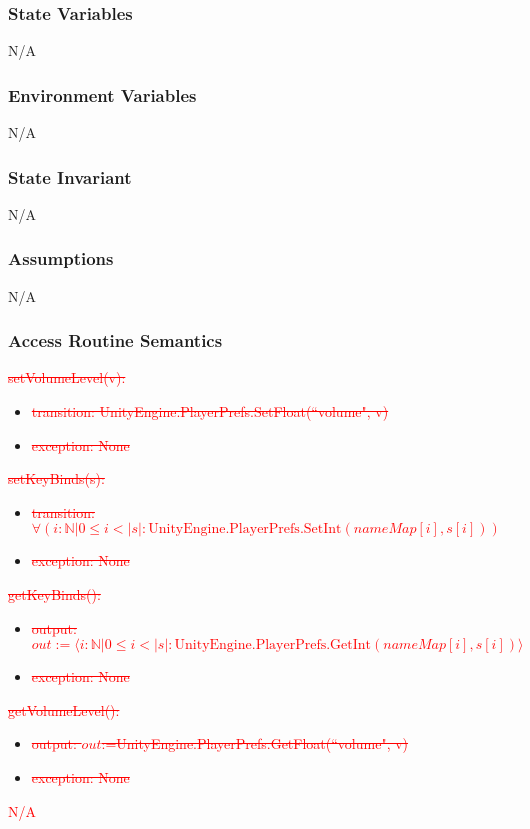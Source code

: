 \documentclass[12pt]{article}
\begin{document}
\subsubsection {State Variables}
N/A

\subsubsection {Environment Variables}
N/A

\subsubsection {State Invariant}
N/A
\subsubsection {Assumptions}
N/A
\subsubsection {Access Routine Semantics}

\noindent \textcolor{red}{\sout{setVolumeLevel(v):}}
\begin{itemize}
	\item \textcolor{red}{\sout{transition: UnityEngine.PlayerPrefs.SetFloat(``volume", v)}}
	\item \textcolor{red}{\sout{exception: None}}
\end{itemize}

\noindent \textcolor{red}{\sout{setKeyBinds(s):}}
\begin{itemize}
	\item \textcolor{red}{\sout{transition: $\forall(i: \mathbb{N} | 0 \leq i < |s|: \text{UnityEngine.PlayerPrefs.SetInt}(nameMap[i], s[i]))$}}
	\item \textcolor{red}{\sout{exception: None}}
\end{itemize}

\noindent \textcolor{red}{\sout{getKeyBinds():}}
\begin{itemize}
	\item \textcolor{red}{\sout{output: $out:=\langle i: \mathbb{N} | 0 \leq i < |s|: \text{UnityEngine.PlayerPrefs.GetInt}(nameMap[i], s[i]) \rangle$}}
	\item \textcolor{red}{\sout{exception: None}}
\end{itemize}

\noindent \textcolor{red}{\sout{getVolumeLevel():}}
\begin{itemize}
	\item \textcolor{red}{\sout{output: $out$:=UnityEngine.PlayerPrefs.GetFloat(``volume", v)}}
	\item \textcolor{red}{\sout{exception: None}}
\end{itemize}
\textcolor{red}{N/A}
\end{document}
